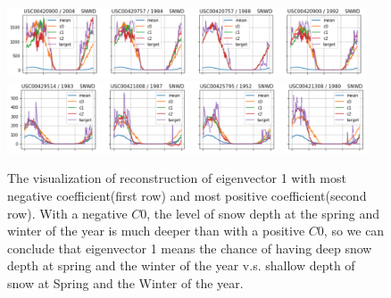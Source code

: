 \documentclass[a4paper]{article}
\begin{document}
\begin{figure}[!htp]
\begin{center}
\includegraphics[width=0.95\textwidth]{coef1_neg.png}
\includegraphics[width=0.95\textwidth]{coef1_pos.png}
\caption{\label{fig:coef1} The visualization of reconstruction of eigenvector 1 with most negative coefficient(first row) and most positive coefficient(second row). With a negative $C0$, the level of snow depth at the spring and winter of the year is much deeper than with a positive $C0$, so we can conclude that eigenvector 1 means the chance of having deep snow depth at spring and the winter of the year v.s. shallow depth of snow at Spring and the Winter of the year.}
\end{center}
\end{figure}
\end{document}
